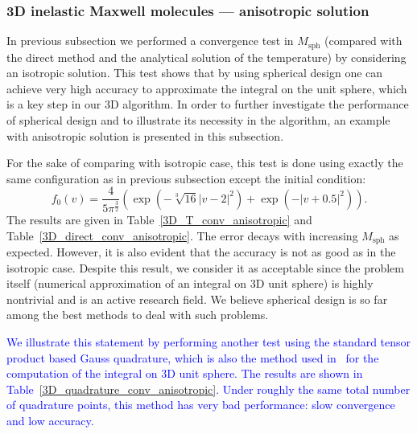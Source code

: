 \documentclass[review,times]{elsarticle}
\begin{document}
{\color{red} \subsubsection{3D inelastic Maxwell molecules  --- anisotropic solution}

In previous subsection we performed a convergence test in $M_\text{sph}$ (compared with the direct method and the analytical solution of the temperature) by considering an isotropic solution. This test shows that by using spherical design one can achieve very high accuracy to approximate the integral on the unit sphere, which is a key step in our 3D algorithm. In order to further investigate the performance of spherical design and to illustrate its necessity in the algorithm, an example with anisotropic solution is presented in this subsection.

For the sake of comparing with isotropic case, this test is done using exactly the same configuration as in previous subsection except the initial condition:
\begin{equation}\label{3D_anisotropic}
  f_0(v) = \frac{4}{5\pi^{\frac{3}{2}}}\left(\exp(-\sqrt[3]{16}|v-2|^2) + \exp(-|v+0.5|^2)\right).
\end{equation}
The results are given in Table~\ref{3D_T_conv_anisotropic} and Table~\ref{3D_direct_conv_anisotropic}. The error decays with increasing $M_{\text{sph}}$ as expected. However, it is also evident that the accuracy is not as good as in the isotropic case. Despite this result, we consider it as acceptable since the problem itself (numerical approximation of an integral on 3D unit sphere) is highly nontrivial and is an active research field. We believe spherical design is so far among the best methods to deal with such problems.} \textcolor{blue}{We illustrate this statement by performing another test using the standard tensor product based Gauss quadrature, which is also the method used in~\cite{WZR15} for the computation of the integral on 3D unit sphere. The results are shown in Table~\ref{3D_quadrature_conv_anisotropic}. Under roughly the same total number of quadrature points, this method has very bad performance: slow convergence and low accuracy.}
\end{document}
